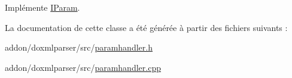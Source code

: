 Implémente \hyperlink{class_i_param_a9a0e699a1691f990e89dc5625cac5436}{I\+Param}.



La documentation de cette classe a été générée à partir des fichiers suivants \+:\begin{DoxyCompactItemize}
\item 
addon/doxmlparser/src/\hyperlink{paramhandler_8h}{paramhandler.\+h}\item 
addon/doxmlparser/src/\hyperlink{paramhandler_8cpp}{paramhandler.\+cpp}\end{DoxyCompactItemize}

